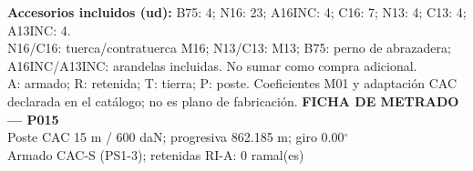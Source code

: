 \begingroup\scriptsize
\textbf{Accesorios incluidos (ud):} B75: 4; N16: 23; A16INC: 4; C16: 7; N13: 4; C13: 4; A13INC: 4.\\
N16/C16: tuerca/contratuerca M16; N13/C13: M13; B75: perno de abrazadera; A16INC/A13INC: arandelas incluidas. No sumar como compra adicional.\\
A: armado; R: retenida; T: tierra; P: poste. Coeficientes M01 y adaptación CAC declarada en el catálogo; no es plano de fabricación.
\endgroup\endgroup
\clearpage{}
\begingroup\small\setlength{\parskip}{3pt}\renewcommand{\arraystretch}{1.05}
\textbf{\large FICHA DE METRADO — P015}\\[4pt]
Poste CAC 15 m / 600 daN; progresiva 862.185 m; giro 0.00\ensuremath{^\circ}\\
Armado CAC-S (PS1-3); retenidas RI-A: 0 ramal(es)\\
\begingroup\scriptsize
